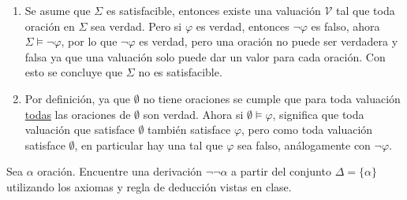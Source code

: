 \begin{sol}
    \begin{enumerate}[label=(\alph*)]
        \item Se asume que $\Sigma$ es satisfacible, entonces existe una valuación $\mathcal{V}$ tal que toda oración en $\Sigma$ sea verdad. Pero si $\varphi$ es verdad, entonces $\neg\varphi$ es falso, ahora $\Sigma\models\neg\varphi$, por lo que $\neg\varphi$ es verdad, pero una oración no puede ser verdadera y falsa ya que una valuación solo puede dar un valor para cada oración. Con esto se concluye que $\Sigma$ no es satisfacible.
        \item Por definición, ya que $\emptyset$ no tiene oraciones se cumple que para toda valuación \underline{todas} las oraciones de $\emptyset$ son verdad. Ahora si $\emptyset\models\varphi$, significa que toda valuación que satisface $\emptyset$ también satisface $\varphi$, pero como toda valuación satisface $\emptyset$, en particular hay una tal que $\varphi$ sea falso, análogamente con $\neg\varphi$.
    \end{enumerate}
\end{sol}

\begin{prob}[5 pts]
    Sea $\alpha$ oración. Encuentre una derivación $\neg \neg \alpha$ a partir del conjunto $\Delta=\{\alpha\}$ utilizando los axiomas y regla de deducción vistas en clase.
\end{prob}

